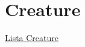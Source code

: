 \section{Creature}\label{creature}

\href{Lista\%20Creature\%20678add636b3e47cd8601644e2f84f184.csv}{Lista
Creature}
